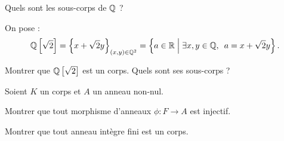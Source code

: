 \begin{exo}
Quels sont les sous-corps de \(\mathbb{Q}\) ?
\end{exo}

\begin{corr}
\end{corr}

\begin{exo}
On pose : \[\Q\croch{\sqrt{2}}=\accol{x+\sqrt{2}y}_{\paren{x,y}\in\Q^2}=\accol{a\in\R\tq\quantifs{\exists x,y\in\Q}a=x+\sqrt{2}y}.\]

Montrer que \(\mathbb{Q}\left[\sqrt{2}\right]\) est un corps. Quels sont ses sous-corps ?
\end{exo}

\begin{corr}
\end{corr}

\begin{exo}
Soient \(K\) un corps et \(A\) un anneau non-nul.

Montrer que tout morphisme d'anneaux \(\phi:F\to A\) est injectif.
\end{exo}

\begin{corr}
\end{corr}

\begin{exo}
Montrer que tout anneau intègre fini est un corps.
\end{exo}

\begin{corr}
\end{corr}